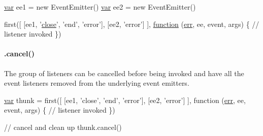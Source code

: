 \begin{DoxyCode}
\hyperlink{018__def_8c_a335628f2e9085305224b4f9cc6e95ed5}{var} ee1 = \textcolor{keyword}{new} EventEmitter()
\hyperlink{018__def_8c_a335628f2e9085305224b4f9cc6e95ed5}{var} ee2 = new EventEmitter()

first([
  [ee1, '\hyperlink{structcmd_8h_ae152484c890a24e4d9b4980e7b965be0}{close}', 'end', 'error'],
  [ee2, 'error']
], \hyperlink{class_test_a51a683fa4fcec142ab1574e00a7b6860}{function} (\hyperlink{message_8cpp_aede5746344fdce99647541101eaa7f06}{err}, ee, event, args) \{
  \textcolor{comment}{// listener invoked}
\})
\end{DoxyCode}


\paragraph*{.cancel()}

The group of listeners can be cancelled before being invoked and have all the event listeners removed from the underlying event emitters.


\begin{DoxyCode}
\hyperlink{018__def_8c_a335628f2e9085305224b4f9cc6e95ed5}{var} thunk = first([
  [ee1, \textcolor{stringliteral}{'close'}, \textcolor{stringliteral}{'end'}, \textcolor{stringliteral}{'error'}],
  [ee2, \textcolor{stringliteral}{'error'}]
], \textcolor{keyword}{function} (\hyperlink{message_8cpp_aede5746344fdce99647541101eaa7f06}{err}, ee, event, args) \{
  \textcolor{comment}{// listener invoked}
\})

\textcolor{comment}{// cancel and clean up}
thunk.cancel()
\end{DoxyCode}
 